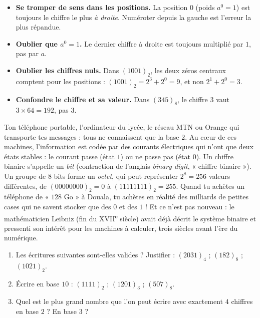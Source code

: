 \documentclass[11pt]{article}
\begin{document}
\begin{attention}
\begin{itemize}
\item \textbf{Se tromper de sens dans les positions.} La position $0$ (poids $a^0 = 1$) est toujours le chiffre le plus \emph{à droite}. Numéroter depuis la gauche est l'erreur la plus répandue.
\item \textbf{Oublier que $a^0 = 1$.} Le dernier chiffre à droite est toujours multiplié par $1$, pas par $a$.
\item \textbf{Oublier les chiffres nuls.} Dans $(1001)_2$, les deux zéros centraux comptent pour les positions : $(1001)_2 = 2^3 + 2^0 = 9$, et non $2^1 + 2^0 = 3$.
\item \textbf{Confondre le chiffre et sa valeur.} Dans $(345)_8$, le chiffre $3$ vaut $3 \times 64 = 192$, pas $3$.
\end{itemize}
\end{attention}

\begin{savaistu}
Ton téléphone portable, l'ordinateur du lycée, le réseau MTN ou Orange qui transporte tes messages : tous ne connaissent que la base $2$. Au cœur de ces machines, l'information est codée par des courants électriques qui n'ont que deux états stables : le courant passe (état $1$) ou ne passe pas (état $0$). Un chiffre binaire s'appelle un \emph{bit} (contraction de l'anglais \emph{binary digit}, « chiffre binaire »). Un groupe de $8$ bits forme un \emph{octet}, qui peut représenter $2^8 = 256$ valeurs différentes, de $(00000000)_2 = 0$ à $(11111111)_2 = 255$. Quand tu achètes un téléphone de « $128$ Go » à Douala, tu achètes en réalité des milliards de petites cases qui ne savent stocker que des $0$ et des $1$ ! Et ce n'est pas nouveau : le mathématicien Leibniz (fin du XVII\textsuperscript{e} siècle) avait déjà décrit le système binaire et pressenti son intérêt pour les machines à calculer, trois siècles avant l'ère du numérique.
\end{savaistu}

\begin{exercice}
\begin{enumerate}
\item Les écritures suivantes sont-elles valides ? Justifier : $(2031)_4$ ; $(182)_8$ ; $(1021)_2$.
\item Écrire en base $10$ : $(1111)_2$ ; $(1201)_3$ ; $(507)_8$.
\item Quel est le plus grand nombre que l'on peut écrire avec exactement $4$ chiffres en base $2$ ? En base $3$ ?
\end{enumerate}
\end{exercice}
\end{document}
